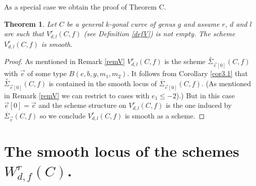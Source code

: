 \documentclass{article}
\newtheorem{theorem}{Theorem}
\theoremstyle{definition}
\theoremstyle{remark}
\begin{document}
As a special case we obtain the proof of Theorem C.
\begin{theorem}\label{TheoC}
Let $C$ be a general $k$-gonal curve of genus $g$ and assume $r$, $d$ and $l$ are such that $V^r_{d,l}(C,f)$ (see Definition \ref{defV}) is not empty.
The scheme $V^r_{d,l}(C,f)$ is smooth.
\end{theorem}

\begin{proof}
As mentioned in Remark \ref{remV} $V^r_{d,l}(C,f)$ is the scheme $\overset{\circ}{\Sigma}_{\overrightarrow {e}[0]}(C,f)$ with $\overrightarrow {e}$ of some type $B(e,b,y,m_1,m_2)$.
It follows from Corollary \ref{cor3.1} that $\overset {\circ}{\Sigma}_{\overrightarrow {e}[0]}(C,f)$ is contained in the smooth locus of $\overline{\Sigma}_{\overrightarrow{e}[0]}(C,f)$.
(As mentioned in Remark \ref{remV} we can restrict to cases with $e_1 \leq -2$).)
But in this case $\overrightarrow {e}[0]=\overrightarrow {e}$ and the scheme structure on $V^r_{d,l}(C,f)$ is the one induced by $\overline{\Sigma}_{\overrightarrow {e}}(C,f)$ so we conclude $V^r_{d,l}(C,f)$ is smooth as a scheme.
\end{proof}

\section{The smooth locus of the schemes $W^r_{d,f}(C)$.}\label{section3}
\end{document}
